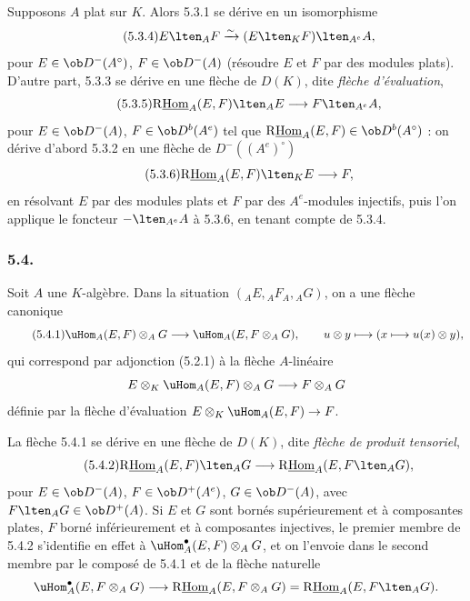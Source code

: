 Supposons $A$ plat sur $K$. Alors 5.3.1 se dérive en un isomorphisme
\begin{equation}\tag{5.3.4}
E\lten_AF\xrightarrow{\sim}(E\lten_KF)\lten_{A^e}A,
\end{equation}
pour $E\in\ob D^-(A^\circ)$, $F\in\ob D^-(A)$ (résoudre $E$ et $F$ par des modules plats). D'autre part, 5.3.3 se dérive en une flèche de $D(K)$, dite \emph{flèche d'évaluation},
\begin{equation}\tag{5.3.5}
\mathrm{R}\underline{\mathrm{Hom}}_A(E,F)\lten_AE\longrightarrow F\lten_{A^e}A,
\end{equation}
pour $E\in\ob D^-(A)$, $F\in\ob D^b(A^e)$ tel que $\mathrm{R}\underline{\mathrm{Hom}}_A(E,F)\in\ob D^b(A^\circ)$ : on dérive d'abord 5.3.2 en une flèche de $D^-((A^e)^\circ)$
\begin{equation}\tag{5.3.6}
\mathrm{R}\underline{\mathrm{Hom}}_A(E,F)\lten_KE\longrightarrow F,
\end{equation}
en résolvant $E$ par des modules plats et $F$ par des $A^e$-modules injectifs, puis l'on applique le foncteur $-\lten_{A^e}A$ à 5.3.6, en tenant compte de 5.3.4.

\subsubsection*{5.4.}

Soit $A$ une $K$-algèbre. Dans la situation $({}_AE,{}_AF_A,{}_AG)$, on a une flèche canonique
\begin{equation}\tag{5.4.1}
\uHom_A(E,F)\otimes_AG\longrightarrow\uHom_A(E,F\otimes_AG),
\qquad u\otimes y\longmapsto(x\longmapsto u(x)\otimes y),
\end{equation}
qui correspond par adjonction (5.2.1) à la flèche $A$-linéaire
\[
E\otimes_K\uHom_A(E,F)\otimes_AG\longrightarrow F\otimes_AG
\]
définie par la flèche d'évaluation $E\otimes_K\uHom_A(E,F)\to F$.

La flèche 5.4.1 se dérive en une flèche de $D(K)$, dite \emph{flèche de produit tensoriel},
\begin{equation}\tag{5.4.2}
\mathrm{R}\underline{\mathrm{Hom}}_A(E,F)\lten_AG\longrightarrow\mathrm{R}\underline{\mathrm{Hom}}_A(E,F\lten_AG),
\end{equation}
pour $E\in\ob D^-(A)$, $F\in\ob D^+(A^e)$, $G\in\ob D^-(A)$, avec $F\lten_AG\in\ob D^+(A)$. Si $E$ et $G$ sont bornés supérieurement et à composantes plates, $F$ borné inférieurement et à composantes injectives, le premier membre de 5.4.2 s'identifie en effet à $\uHom_A^\bullet(E,F)\otimes_AG$, et on l'envoie dans le second membre par le composé de 5.4.1 et de la flèche naturelle
\[
\uHom_A^\bullet(E,F\otimes_AG)\longrightarrow \mathrm{R}\underline{\mathrm{Hom}}_A(E,F\otimes_AG)=\mathrm{R}\underline{\mathrm{Hom}}_A(E,F\lten_AG).
\]

